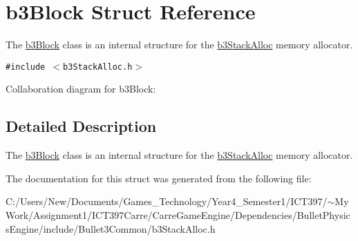 \hypertarget{structb3_block}{
\section{b3Block Struct Reference}
\label{structb3_block}
}
The \hyperlink{structb3_block}{b3Block} class is an internal structure for the \hyperlink{classb3_stack_alloc}{b3StackAlloc} memory allocator.  


{\tt \#include $<$b3StackAlloc.h$>$}

Collaboration diagram for b3Block:

\subsection{Detailed Description}
The \hyperlink{structb3_block}{b3Block} class is an internal structure for the \hyperlink{classb3_stack_alloc}{b3StackAlloc} memory allocator. 

The documentation for this struct was generated from the following file:\begin{CompactItemize}
\item 
C:/Users/New/Documents/Games\_\-Technology/Year4\_\-Semester1/ICT397/$\sim$My Work/Assignment1/ICT397Carre/CarreGameEngine/Dependencies/BulletPhysicsEngine/include/Bullet3Common/b3StackAlloc.h\end{CompactItemize}
